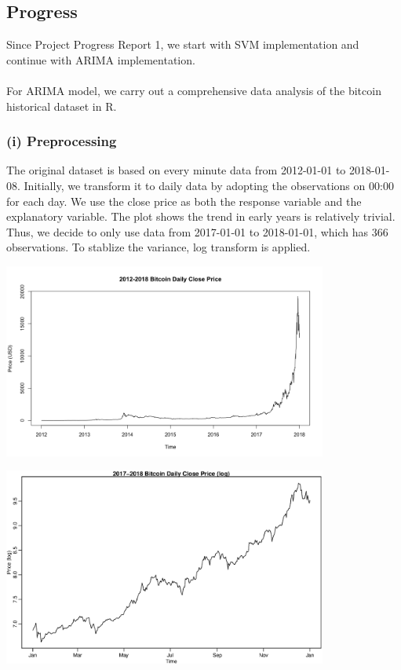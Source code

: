 \documentclass[11pt,a4paper]{article}
\begin{document}
\subsection*{Progress}
Since Project Progress Report 1, we start with SVM implementation and continue with ARIMA implementation.
\\ \\
For ARIMA model, we carry out a comprehensive data analysis of the bitcoin historical dataset in R.

\subsubsection*{(i) Preprocessing}
The original dataset is based on every minute data from 2012-01-01 to 2018-01-08. Initially, we transform it to daily data by adopting the observations on 00:00 for each day. We use the close price as both the response variable and the explanatory variable. The plot shows the trend in early years is relatively trivial. Thus, we decide to only use data from 2017-01-01 to 2018-01-01, which has 366 observations. To stablize the variance, log transform is applied.


\begin{center}
   \includegraphics[width=0.8\textwidth]{2012-2018.png}
\end{center}
\graphicspath{{./Figures/}}

\begin{center}
   \includegraphics[width=0.8\textwidth]{2017-2018_log.eps}
\end{center}
\graphicspath{{./Figures/}}
\end{document}
